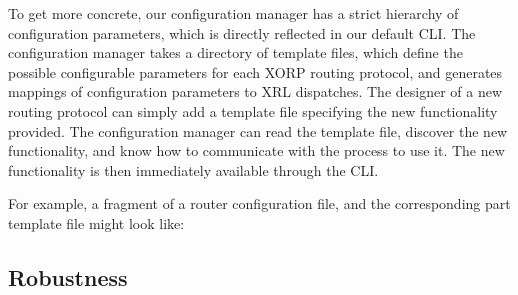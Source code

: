To get more concrete, our configuration manager has a strict hierarchy
of configuration parameters, which is directly reflected in our
default CLI.  The configuration manager takes a directory of template
files, which define the possible configurable parameters for each XORP
routing protocol, and generates mappings of configuration parameters
to XRL dispatches.  The designer of a new routing protocol can simply
add a template file specifying the new functionality provided.  The
configuration manager can read the template file, discover the new
functionality, and know how to communicate with the process to use it.
The new functionality is then immediately available through the CLI.

For example, a fragment of a router configuration file, and the
corresponding part template file might look like:
\vspace{-0.1in}

\noindent{}

\subsection{Robustness}

